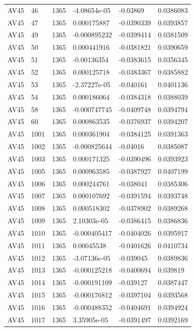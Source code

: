 \begin{longtable}{llllll}
AV45 & 46 & 1365 & -4.08654e-05 & -0.03869 & 0.0386083 \\
AV45 & 47 & 1365 & 0.000175887 & -0.0390339 & 0.0393857 \\
AV45 & 49 & 1365 & -0.000895232 & -0.0399414 & 0.0381509 \\
AV45 & 50 & 1365 & 0.000441916 & -0.0381821 & 0.0390659 \\
AV45 & 51 & 1365 & -0.00136354 & -0.0383615 & 0.0356345 \\
AV45 & 52 & 1365 & 0.000125718 & -0.0383367 & 0.0385882 \\
AV45 & 53 & 1365 & -2.37227e-05 & -0.040161 & 0.0401136 \\
AV45 & 54 & 1365 & 0.000186064 & -0.0384318 & 0.0388039 \\
AV45 & 58 & 1365 & -0.000747745 & -0.0409748 & 0.0394794 \\
AV45 & 60 & 1365 & 0.000863535 & -0.0376937 & 0.0394207 \\
AV45 & 1001 & 1365 & 0.000361904 & -0.0384125 & 0.0391363 \\
AV45 & 1002 & 1365 & -0.000825644 & -0.04016 & 0.0385087 \\
AV45 & 1003 & 1365 & 0.000171325 & -0.0390496 & 0.0393923 \\
AV45 & 1005 & 1365 & 0.000963585 & -0.0387927 & 0.0407199 \\
AV45 & 1006 & 1365 & 0.000244761 & -0.038041 & 0.0385306 \\
AV45 & 1007 & 1365 & 0.000107692 & -0.0391594 & 0.0393748 \\
AV45 & 1008 & 1365 & 0.000518302 & -0.0378902 & 0.0389268 \\
AV45 & 1009 & 1365 & 2.10303e-05 & -0.0386415 & 0.0386836 \\
AV45 & 1010 & 1365 & -0.000405417 & -0.0404026 & 0.0395917 \\
AV45 & 1011 & 1365 & 0.00045538 & -0.0401626 & 0.0410734 \\
AV45 & 1012 & 1365 & -3.07136e-05 & -0.039045 & 0.0389836 \\
AV45 & 1013 & 1365 & -0.000125218 & -0.0400694 & 0.039819 \\
AV45 & 1014 & 1365 & -0.000191109 & -0.039127 & 0.0387447 \\
AV45 & 1015 & 1365 & -0.000176812 & -0.0397104 & 0.0393568 \\
AV45 & 1016 & 1365 & -0.000488352 & -0.0404691 & 0.0394924 \\
AV45 & 1017 & 1365 & 3.35905e-05 & -0.0391497 & 0.0392169 \\

\end{longtable}
